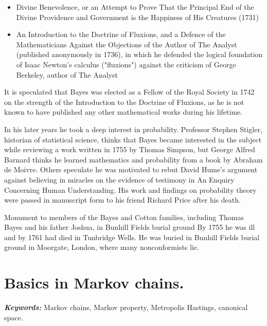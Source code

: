\documentclass[english,graybox,envcountchap,envcountsame,sectrefs,shortlabels]{svmono}
\theoremstyle{style}
\renewenvironment{keywords}{\textit{\bf Keywords: } \sffamily }{}
\begin{document}
\begin{itemize}
\item Divine Benevolence, or an Attempt to Prove That the Principal End of the Divine Providence and Government is the Happiness of His Creatures (1731)
\end{itemize}

\begin{itemize}
\item An Introduction to the Doctrine of Fluxions, and a Defence of the Mathematicians Against the Objections of the Author of The Analyst (published anonymously in 1736), in which he defended the logical foundation of Isaac Newton's calculus ("fluxions") against the criticism of George Berkeley, author of The Analyst
\end{itemize}

It is speculated that Bayes was elected as a Fellow of the Royal Society in 1742 on the strength of the Introduction to the Doctrine of Fluxions, as he is not known to have published any other mathematical works during his lifetime.

In his later years he took a deep interest in probability. Professor Stephen Stigler, historian of statistical science, thinks that Bayes became interested in the subject while reviewing a work written in 1755 by Thomas Simpson, but George Alfred Barnard thinks he learned mathematics and probability from a book by Abraham de Moivre. Others speculate he was motivated to rebut David Hume's argument against believing in miracles on the evidence of testimony in An Enquiry Concerning Human Understanding. His work and findings on probability theory were passed in manuscript form to his friend Richard Price after his death.


Monument to members of the Bayes and Cotton families, including Thomas Bayes and his father Joshua, in Bunhill Fields burial ground
By 1755 he was ill and by 1761 had died in Tunbridge Wells. He was buried in Bunhill Fields burial ground in Moorgate, London, where many nonconformists lie.


\chapter{Basics in Markov chains.}
\minitoc
\begin{keywords}
Markov chains, Markov property, Metropolis Hastings, canonical space.
\end{keywords}
\end{document}
